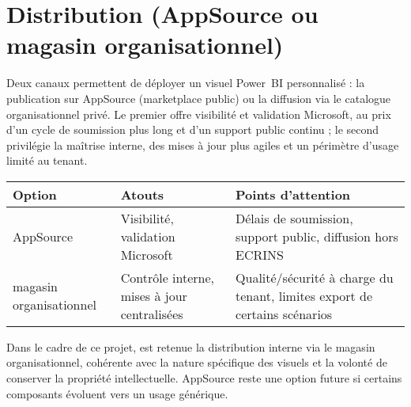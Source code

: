 
\section{Distribution (AppSource ou magasin organisationnel)}
\label{sec:distribution}

Deux canaux permettent de déployer un visuel Power~BI personnalisé : la publication sur AppSource (marketplace public) ou la diffusion via le catalogue organisationnel privé. Le premier offre visibilité et validation Microsoft, au prix d’un cycle de soumission plus long et d’un support public continu ; le second privilégie la maîtrise interne, des mises à jour plus agiles et un périmètre d’usage limité au tenant.

\begin{table}[h]
\small
\setlength{\tabcolsep}{5pt}
\centering
\begin{tabularx}{\linewidth}{l X X}
\toprule
\textbf{Option} & \textbf{Atouts} & \textbf{Points d’attention} \\
\midrule
AppSource & Visibilité, validation Microsoft & Délais de soumission, support public, diffusion hors ECRINS \\
magasin organisationnel & Contrôle interne, mises à jour centralisées & Qualité/sécurité à charge du tenant, limites export de certains scénarios \\
\bottomrule
\end{tabularx}
\end{table}

Dans le cadre de ce projet, est retenue la distribution interne via le magasin organisationnel, cohérente avec la nature spécifique des visuels et la volonté de conserver la propriété intellectuelle. AppSource reste une option future si certains composants évoluent vers un usage générique.
